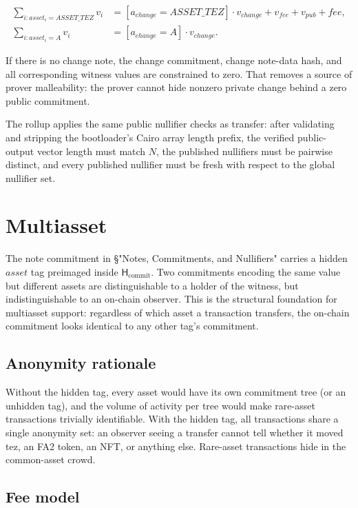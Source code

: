 \documentclass[11pt]{article}
\newcommand{\Hash}{\mathsf{H}}
\begin{document}
\begin{align*}
\sum_{i : asset_i = ASSET\_TEZ} v_i &= [a_{change} = ASSET\_TEZ] \cdot v_{change} + v_{fee} + v_{pub} + fee, \\
\sum_{i : asset_i = A} v_i &= [a_{change} = A] \cdot v_{change}.
\end{align*}

If there is no change note, the change commitment, change note-data hash, and all
corresponding witness values are constrained to zero. That removes a source of
prover malleability: the prover cannot hide nonzero private change behind a
zero public commitment.

The rollup applies the same public nullifier checks as transfer: after validating
and stripping the bootloader's Cairo array length prefix, the verified
public-output vector length must match \(N\), the published nullifiers must be
pairwise distinct, and every published nullifier must be fresh with respect to
the global nullifier set.

\section{Multiasset}

The note commitment in §"Notes, Commitments, and Nullifiers" carries a
hidden \(asset\) tag preimaged inside \(\Hash_{\mathrm{commit}}\). Two
commitments encoding the same value but different assets are
distinguishable to a holder of the witness, but indistinguishable to an
on-chain observer. This is the structural foundation for multiasset
support: regardless of which asset a transaction transfers, the
on-chain commitment looks identical to any other tag's commitment.

\subsection{Anonymity rationale}

Without the hidden tag, every asset would have its own commitment
tree (or an unhidden tag), and the volume of activity per tree would
make rare-asset transactions trivially identifiable. With the hidden
tag, all transactions share a single anonymity set: an observer
seeing a transfer cannot tell whether it moved tez, an FA2 token,
an NFT, or anything else. Rare-asset transactions hide in the
common-asset crowd.

\subsection{Fee model}
\end{document}
